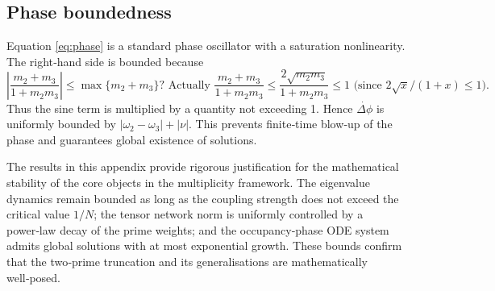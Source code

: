 \documentclass[11pt,a4paper]{article}
\theoremstyle{definition}
\theoremstyle{remark}
\begin{document}
\subsection{Phase boundedness}
Equation \eqref{eq:phase} is a standard phase oscillator with a saturation nonlinearity.  
The right‑hand side is bounded because
\[
\left| \frac{m_2+m_3}{1+m_2m_3} \right| \le \max\{m_2+m_3\} \text{? Actually } \frac{m_2+m_3}{1+m_2m_3} \le \frac{2\sqrt{m_2m_3}}{1+m_2m_3} \le 1 \text{ (since } 2\sqrt{x}/(1+x)\le 1\text{).}
\]
Thus the sine term is multiplied by a quantity not exceeding 1.  
Hence \(\dot{\Delta\phi}\) is uniformly bounded by \(|\omega_2-\omega_3| + |\nu|\).  
This prevents finite‑time blow‑up of the phase and guarantees global existence of solutions.

The results in this appendix provide rigorous justification for the mathematical stability of the core objects in the multiplicity framework.  
The eigenvalue dynamics remain bounded as long as the coupling strength does not exceed the critical value \(1/N\); the tensor network norm is uniformly controlled by a power‑law decay of the prime weights; and the occupancy‑phase ODE system admits global solutions with at most exponential growth.  
These bounds confirm that the two‑prime truncation and its generalisations are mathematically well‑posed.


\nocite{*}
  
 
\end{document}
